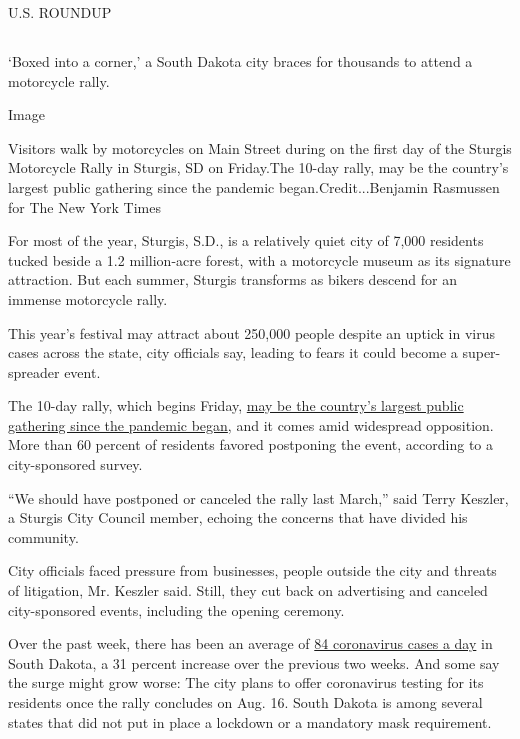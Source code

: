 U.S. ROUNDUP

\hypertarget{-7}{%
\subsection{}\label{-7}}

`Boxed into a corner,' a South Dakota city braces for thousands to
attend a motorcycle rally.

Image

Visitors walk by motorcycles on Main Street during on the first day of
the Sturgis Motorcycle Rally in Sturgis, SD on Friday.The 10-day rally,
may be the country's largest public gathering since the pandemic
began.Credit...Benjamin Rasmussen for The New York Times

For most of the year, Sturgis, S.D., is a relatively quiet city of 7,000
residents tucked beside a 1.2 million-acre forest, with a motorcycle
museum as its signature attraction. But each summer, Sturgis transforms
as bikers descend for an immense motorcycle rally.

This year's festival may attract about 250,000 people despite an uptick
in virus cases across the state, city officials say, leading to fears it
could become a super-spreader event.

The 10-day rally, which begins Friday,
\href{https://www.nytimes3xbfgragh.onion/2020/08/06/us/sturgis-motorcyle-rally-coronavirus.html}{may
be the country's largest public gathering since the pandemic began}, and
it comes amid widespread opposition. More than 60 percent of residents
favored postponing the event, according to a city-sponsored survey.

``We should have postponed or canceled the rally last March,'' said
Terry Keszler, a Sturgis City Council member, echoing the concerns that
have divided his community.

City officials faced pressure from businesses, people outside the city
and threats of litigation, Mr. Keszler said. Still, they cut back on
advertising and canceled city-sponsored events, including the opening
ceremony.

Over the past week, there has been an average of
\href{https://www.nytimes3xbfgragh.onion/interactive/2020/us/south-dakota-coronavirus-cases.html}{84
coronavirus cases a day} in South Dakota, a 31 percent increase over the
previous two weeks. And some say the surge might grow worse: The city
plans to offer coronavirus testing for its residents once the rally
concludes on Aug. 16. South Dakota is among several states that did not
put in place a lockdown or a mandatory mask requirement.

